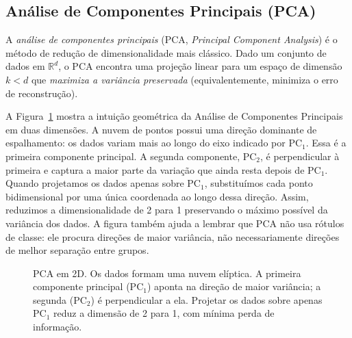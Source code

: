 \documentclass[12pt,a4paper]{article}
\begin{document}
\subsection{Análise de Componentes Principais (PCA)}
\label{subsec:pca}

A \emph{análise de componentes principais} (PCA, \textit{Principal Component Analysis}) é o método de redução de dimensionalidade mais clássico. Dado um conjunto de dados em $\mathbb{R}^d$, o PCA encontra uma projeção linear para um espaço de dimensão $k < d$ que \emph{maximiza a variância preservada} (equivalentemente, minimiza o erro de reconstrução).

A Figura~\ref{fig:pca} mostra a intuição geométrica da Análise de Componentes Principais em duas dimensões. A nuvem de pontos possui uma direção dominante de espalhamento: os dados variam mais ao longo do eixo indicado por PC$_1$. Essa é a primeira componente principal. A segunda componente, PC$_2$, é perpendicular à primeira e captura a maior parte da variação que ainda resta depois de PC$_1$. Quando projetamos os dados apenas sobre PC$_1$, substituímos cada ponto bidimensional por uma única coordenada ao longo dessa direção. Assim, reduzimos a dimensionalidade de 2 para 1 preservando o máximo possível da variância dos dados. A figura também ajuda a lembrar que PCA não usa rótulos de classe: ele procura direções de maior variância, não necessariamente direções de melhor separação entre grupos.

\begin{figure}[ht]
\centering
{}
\caption{PCA em 2D. Os dados formam uma nuvem elíptica. A primeira componente principal (PC$_1$) aponta na direção de maior variância; a segunda (PC$_2$) é perpendicular a ela. Projetar os dados sobre apenas PC$_1$ reduz a dimensão de 2 para 1, com mínima perda de informação.}
\label{fig:pca}
\end{figure}
\end{document}
